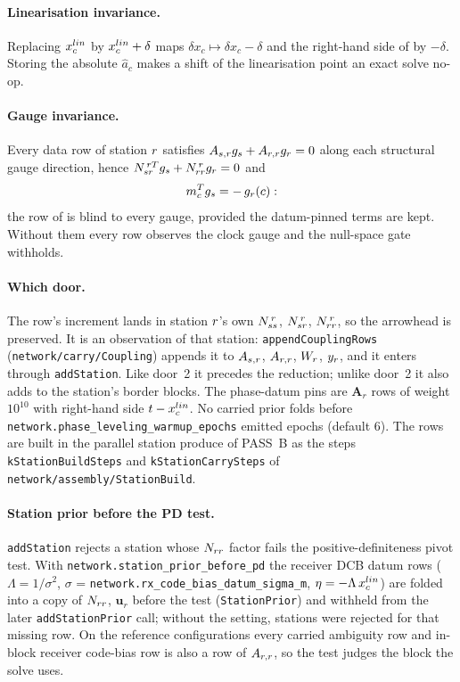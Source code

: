 \documentclass[main.tex]{subfiles}
\begin{document}
\paragraph{Linearisation invariance.}
Replacing $x^{lin}_{c}$ by $x^{lin}_{c}+\delta$ maps $\delta x_c \mapsto
\delta x_c - \delta$ and the right-hand side of  by
$-\delta$. Storing the absolute $\hat a_c$ makes a shift of the
linearisation point an exact solve no-op.

\paragraph{Gauge invariance.}
Every data row of station $r$ satisfies
$A_{s,r}g_s + A_{r,r}g_r = 0$ along each
structural gauge direction, hence
$N_{sr}^{\,rT}g_s + N_{rr}^{\,r}g_r = 0$ and
\begin{equation}
m_{c}^{T}g_s = -\,g_r(c):
\label{eq:veh-gauge}
\end{equation}
the row of  is blind to every gauge, provided the
datum-pinned terms are kept. Without them every row observes the clock
gauge and the null-space gate withholds.

\paragraph{Which door.}
The row's increment lands in station $r$'s own $N_{ss}^{\,r}$,
$N_{sr}^{\,r}$, $N_{rr}^{\,r}$, so the arrowhead is preserved. It is an
observation of that station: \texttt{appendCouplingRows}
(\texttt{network/carry/Coupling}) appends it to
$A_{s,r}$, $A_{r,r}$, $W_r$, $y_r$, and it
enters through \texttt{addStation}. Like door~2 it precedes the reduction;
unlike door~2 it also adds to the station's border blocks. The phase-datum
pins are $\bm{A}_r$ rows of weight $10^{10}$ with right-hand side
$t - x^{lin}_{c}$. No carried prior folds before
\texttt{network.phase\_leveling\_warmup\_epochs} emitted epochs (default 6).
The rows are built in the parallel station produce of PASS~B as the steps
\texttt{kStationBuildSteps} and \texttt{kStationCarrySteps} of
\texttt{network/assembly/StationBuild}.

\paragraph{Station prior before the PD test.}
\texttt{addStation} rejects a station whose $N_{rr}$ factor fails the
positive-definiteness pivot test. With
\texttt{network.station\_prior\_before\_pd} the receiver DCB datum rows
($\Lambda = 1/\sigma^2$, $\sigma$ =
\texttt{network.rx\_code\_bias\_datum\_sigma\_m}, $\eta = -\Lambda\,
x^{lin}_{c}$) are folded into a copy of $N_{rr}$, $\bm{u}_r$ before the test
(\texttt{StationPrior}) and withheld from the later \texttt{addStationPrior}
call; without the setting, stations were rejected for that missing row. On
the reference configurations every carried ambiguity row and in-block
receiver code-bias row is also a row of $A_{r,r}$, so the test
judges the block the solve uses.
\end{document}
